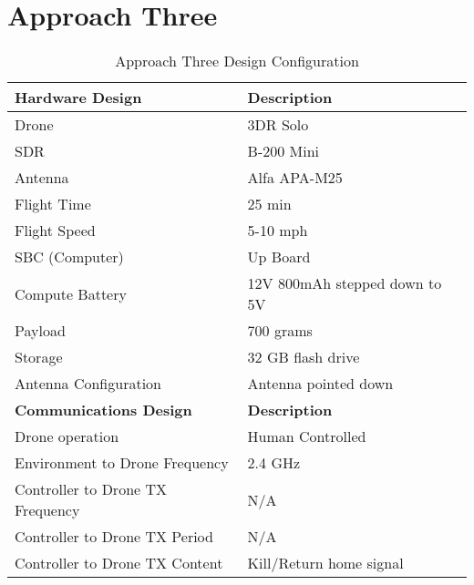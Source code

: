 \section{Approach Three}
\begin{table}[h]
\centering
\caption{Approach Three Design Configuration}
\label{table:approach_three}
\begin{tabular}{|l|l|}
    \hline  \textbf{Hardware Design}              & \textbf{Description}                      \\ \hline
            Drone                                 & 3DR Solo                                  \\
            SDR                                   & B-200 Mini                                \\
            Antenna                               & Alfa APA-M25                              \\
            Flight Time                           & 25 min                                    \\
            Flight Speed                          & 5-10 mph                                  \\
            SBC (Computer)                        & Up Board                                  \\
            Compute Battery                       & 12V 800mAh stepped down to 5V             \\
            Payload                               & 700 grams                                 \\
            Storage                               & 32 GB flash drive                         \\
            Antenna Configuration                 & Antenna pointed down                      \\
    \hline  \textbf{Communications Design}        & \textbf{Description}                      \\ \hline
            Drone operation                       & Human Controlled                          \\
            Environment to Drone Frequency        & 2.4 GHz                                   \\
            Controller to Drone TX Frequency      & N/A                                       \\
            Controller to Drone TX Period         & N/A                                       \\
            Controller to Drone TX Content        & Kill/Return home signal                   \\

\end{tabular}
\end{table}
